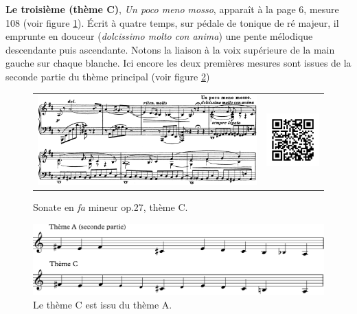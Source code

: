 \textbf{Le troisième (thème C)}, \emph{Un poco meno mosso}, apparaît à la page 6, mesure 108 (voir figure \ref{sonate-theme-3}). Écrit à quatre temps, sur pédale de tonique de ré majeur, il emprunte en douceur (\emph{dolcissimo molto con anima}) une pente mélodique descendante puis ascendante. Notons la liaison à la voix supérieure de la main gauche sur chaque blanche. Ici encore les deux premières mesures sont issues de la seconde partie du thème principal (voir figure \ref{sonate-theme-1-vs-3})

\begin{figure}[!ht]
  \begin{bigcenter}
    \begin{tabular}{lr}
      \includegraphics[width=12.5cm, keepaspectratio]{sonate-theme-C.png}
      &
      \includegraphics[width=3cm, keepaspectratio]{op1-qr.png}
    \end{tabular}
  \end{bigcenter}
  \caption{\label{sonate-theme-3}Sonate en \emph{fa} mineur op.27, thème C.}
\end{figure}

\begin{figure}[!ht]
  \begin{bigcenter}
      \includegraphics[width=12.75cm, keepaspectratio]{sonate-theme-A-vs-C.pdf}\vspace{-0.5cm}
  \end{bigcenter}
  \caption{\label{sonate-theme-1-vs-3}Le thème C est issu du thème A.}
\end{figure}

